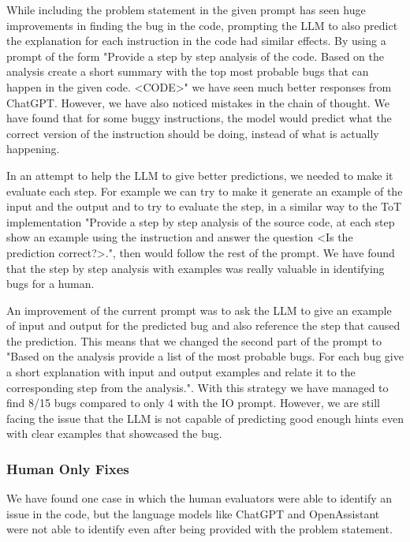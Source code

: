 \documentclass[12pt,a4paper]{report}
\begin{document}
While including the problem statement in the given prompt has seen huge improvements in finding the bug in the code, prompting the LLM to also predict the explanation for each instruction in the code had similar effects. By using a prompt of the form "Provide a step by step analysis of the code. Based on the analysis create a short summary with the top most probable bugs that can happen in the given code.  \textless{CODE}\textgreater" we have seen much better responses from ChatGPT. However, we have also noticed mistakes in the chain of thought. We have found that for some buggy instructions, the model would predict what the correct version of the instruction should be doing, instead of what is actually happening.

In an attempt to help the LLM to give better predictions, we needed to make it evaluate each step. For example we can try to make it generate an example of the input and the output and to try to evaluate the step, in a similar way to the ToT implementation "Provide a step by step analysis of the source code, at each step show an example using the instruction and answer the question \textless{Is the prediction correct?}\textgreater.", then would follow the rest of the prompt. We have found that the step by step analysis with examples was really valuable in identifying bugs for a human. 

An improvement of the current prompt was to ask the LLM to give an example of input and output for the predicted bug and also reference the step that caused the prediction. This means that we changed the second part of the prompt to "Based on the analysis provide a list of the most probable bugs. For each bug give a short explanation with input and output examples and relate it to the corresponding step from the analysis.". With this strategy we have managed to find 8/15 bugs compared to only 4 with the IO prompt. However, we are still facing the issue that the LLM is not capable of predicting good enough hints even with clear examples that showcased the bug.

\subsubsection{Human Only Fixes}

We have found one case in which the human evaluators were able to identify an issue in the code, but the language models like ChatGPT and OpenAssistant were not able to identify even after being provided with the problem statement.
\end{document}
